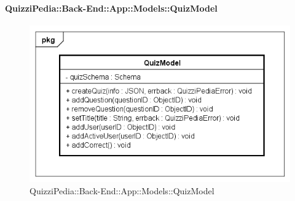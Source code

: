 \paragraph{QuizziPedia::Back-End::App::Models::QuizModel}
\label{QuizziPedia::Back-End::App::Models::QuizModel}
\begin{figure}
	\centering
	\includegraphics[scale=0.45]{UML/Package/QuizziPedia_Back-End_App_Models_QuizModel.png}
	\caption{QuizziPedia::Back-End::App::Models::QuizModel}
\end{figure}